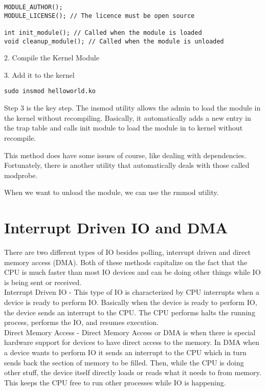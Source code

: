 \documentclass{article}
\begin{document}
\begin{lstlisting}
MODULE_AUTHOR();
MODULE_LICENSE(); // The licence must be open source 

int init_module(); // Called when the module is loaded
void cleanup_module(); // Called when the module is unloaded 
\end{lstlisting}

2. Compile the Kernel Module 

3. Add it to the kernel 

\begin{lstlisting}
sudo insmod helloworld.ko 
\end{lstlisting}

Step 3 is the key step. The insmod utility allows the admin to load the module in the kernel without recompiling. Basically, it automatically adds a new entry in the trap table and calls init module to load the module in to kernel without recompile.

This method does have some issues of course, like dealing with dependencies. Fortunately, there is another utility that automatically deals with those called modprobe.

When we want to unload the module, we can use the rmmod utility. 

\section{Interrupt Driven IO and DMA}

There are two different types of IO besides polling, interrupt driven and direct memory access (DMA). Both of these methods capitalize on the fact that the CPU is much faster than most IO devices and can be doing other things while IO is being sent or received. \\

Interrupt Driven IO - This type of IO is characterized by CPU interrupts when a device is ready to perform IO. Basically when the device is ready to perform IO, the device sends an interrupt to the CPU. The CPU performs halts the running process, performs the IO, and resumes execution. \\


Direct Memory Access - Direct Memory Access or DMA is when there is special hardware support for devices to have direct access to the memory. In DMA when a device wants to perform IO it sends an interrupt to the CPU which in turn sends back the section of memory to be filled. Then, while the CPU is doing other stuff, the device itself directly loads or reads what it needs to from memory. This keeps the CPU free to run other processes while IO is happening.\\
\end{document}
